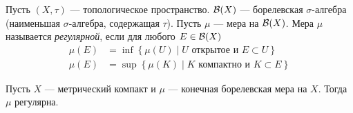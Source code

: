 \begin{df}
 Пусть $(X, \tau)$ --- топологическое пространство. $\mathcal{B}(X)$ --- борелевская  $\sigma$-алгебра (наименьшая $\sigma$-алгебра, содержащая $\tau$). Пусть $\mu$ --- мера на $\mathcal{B}(X)$. Мера $\mu$ называется \textit{регулярной}, если для любого $E \in \mathcal{B}(X)$ \begin{align*}
  \mu(E) &= \inf \left\{ \mu(U) \mid U \text{ открытое и } E \subset U \right\} \\
  \mu(E) &= \sup \left\{ \mu(K) \mid K \text{ компактно и } K \subset E \right\}
 \end{align*} 
\end{df}
\begin{lm}
 Пусть $X$ --- метрический компакт и  $\mu$ --- конечная борелевская мера на $X$. Тогда $\mu$ регулярна.
\end{lm}
